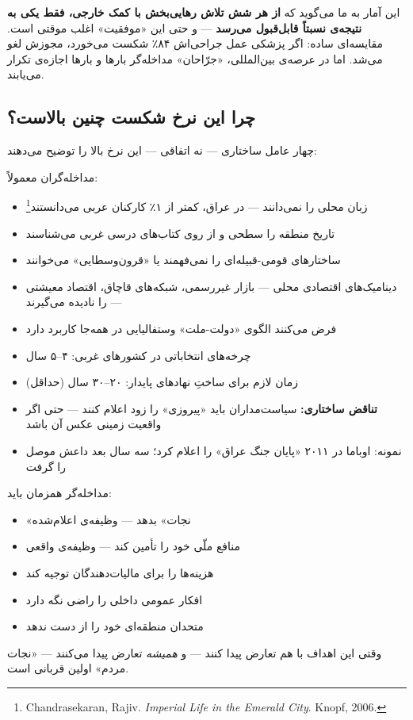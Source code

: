 این آمار به ما می‌گوید که \textbf{از هر شش تلاش رهایی‌بخش با کمک
خارجی، فقط یکی به نتیجه‌ی نسبتاً قابل‌قبول می‌رسد} — و حتی این
«موفقیت» اغلب موقتی است.  مقایسه‌ای ساده: اگر پزشکی عمل جراحی‌اش ۸۴٪
شکست می‌خورد، مجوزش لغو می‌شد.  اما در عرصه‌ی بین‌المللی، «جرّاحان»
مداخله‌گر بارها و بارها اجازه‌ی تکرار می‌یابند.


\subsection{چرا این نرخ شکست چنین بالاست؟}

چهار عامل ساختاری — نه اتفاقی — این نرخ بالا را توضیح می‌دهند:

\begin{tcolorbox}[enemybox, title={عامل ۱: عدم شناخت بافت محلی}]
مداخله‌گران معمولاً:
\begin{itemize}
\item زبان محلی را نمی‌دانند — در عراق، کمتر از ۱٪ کارکنان
 عربی می‌دانستند\footnote{Chandrasekaran, Rajiv.
\textit{Imperial Life in the Emerald City}. Knopf, 2006.}
\item تاریخ منطقه را سطحی و از روی کتاب‌های درسی غربی می‌شناسند
\item ساختارهای قومی-قبیله‌ای را نمی‌فهمند یا «قرون‌وسطایی» می‌خوانند
\item دینامیک‌های اقتصادی محلی — بازار غیررسمی، شبکه‌های قاچاق،
اقتصاد معیشتی — را نادیده می‌گیرند
\item فرض می‌کنند الگوی «دولت-ملت» وستفالیایی در همه‌جا کاربرد دارد
\end{itemize}
\end{tcolorbox}

\begin{tcolorbox}[enemybox, title={عامل ۲: افق زمانی کوتاه}]
\begin{itemize}
\item چرخه‌های انتخاباتی در کشورهای غربی: ۴–۵ سال
\item زمان لازم برای ساختِ نهادهای پایدار: ۲۰–۳۰ سال (حداقل)
\item \textbf{تناقض ساختاری:} سیاست‌مداران باید «پیروزی» را زود اعلام
کنند — حتی اگر واقعیت زمینی عکس آن باشد
\item نمونه: اوباما در ۲۰۱۱ «پایان جنگ عراق» را اعلام کرد؛ سه سال
بعد داعش موصل را گرفت
\end{itemize}
\end{tcolorbox}

\begin{tcolorbox}[enemybox, title={عامل ۳: منافع متضاد}]
مداخله‌گر همزمان باید:
\begin{itemize}
\item «نجات» بدهد — وظیفه‌ی اعلام‌شده
\item منافع ملّی خود را تأمین کند — وظیفه‌ی واقعی
\item هزینه‌ها را برای مالیات‌دهندگان توجیه کند
\item افکار عمومی داخلی را راضی نگه دارد
\item متحدان منطقه‌ای خود را از دست ندهد
\end{itemize}
وقتی این اهداف با هم تعارض پیدا کنند — و \textit{همیشه} تعارض پیدا
می‌کنند — «نجات مردم» اولین قربانی است.
\end{tcolorbox}


